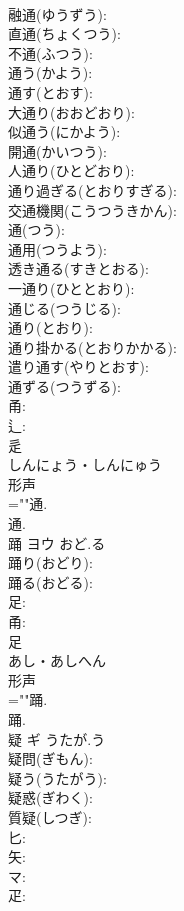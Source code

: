 \documentclass[8pt]{extreport}
\begin{document}
\begin{CJK}{UTF8}{min}
\\	融通(ゆうずう): 
\\	直通(ちょくつう): 
\\	不通(ふつう): 
\\	通う(かよう): 
\\	通す(とおす): 
\\	大通り(おおどおり): 
\\	似通う(にかよう): 
\\	開通(かいつう): 
\\	人通り(ひとどおり): 
\\	通り過ぎる(とおりすぎる): 
\\	交通機関(こうつうきかん): 
\\	通(つう): 
\\	通用(つうよう): 
\\	透き通る(すきとおる): 
\\	一通り(ひととおり): 
\\	通じる(つうじる): 
\\	通り(とおり): 
\\	通り掛かる(とおりかかる): 
\\	遣り通す(やりとおす): 
\\	通ずる(つうずる): 
\\	甬: 
\\	辶: 
\\	辵	
\\	しんにょう・しんにゅう	
\\	形声 
\\	=""通.
\\	通.
\\	踊	ヨウ	おど.る		
\\	踊り(おどり): 
\\	踊る(おどる): 
\\	足: 
\\	甬: 
\\	足	
\\	あし・あしへん	
\\	形声 
\\	=""踊.
\\	踊.
\\	疑	ギ	うたが.う		
\\	疑問(ぎもん): 
\\	疑う(うたがう): 
\\	疑惑(ぎわく): 
\\	質疑(しつぎ): 
\\	匕: 
\\	矢: 
\\	マ: 
\\	疋: 

\end{CJK}
\end{document}
